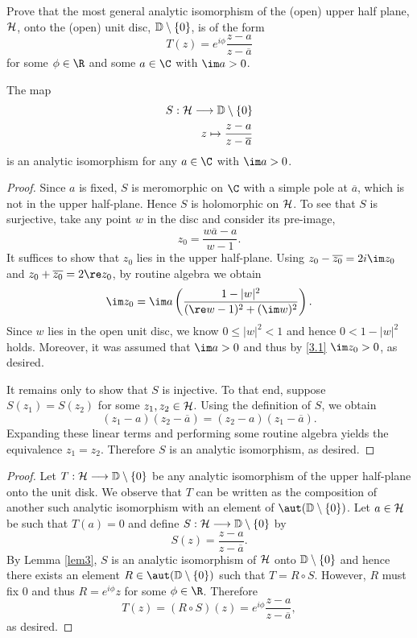 \documentclass[10pt]{amsart}
\begin{document}
\begin{thm}
  \label{Ex3}
  Prove that the most general analytic isomorphism of the (open) upper half plane, $\mathcal{H}$, onto the (open) unit disc, $\mathbb{D} \setminus \{0\}$, is of the form
  $$T(z) = e^{i\phi}\frac{z-a}{z-\overline{a}}$$
  for some $\phi \in \R$ and some $a \in \C$ with $\im a > 0$.

  \begin{lem}
    \label{lem3}
    The map
    \begin{align*}
      S:\mathcal{H} \longrightarrow \mathbb{D} \setminus \{0\} \\
      z \mapsto \frac{z-a}{z-\overline{a}}
    \end{align*}
    is an analytic isomorphism for any $a \in \C$ with $\im a>0$.
    \begin{proof}
      Since $a$ is fixed, $S$ is meromorphic on $\C$ with a simple pole at $\overline{a}$, which is not in the upper half-plane.  Hence $S$ is holomorphic on $\mathcal{H}$.
      To see that $S$ is surjective, take any point $w$ in the disc and consider its pre-image, $$z_0 = \frac{w\overline{a} - a}{w - 1}.$$
      It suffices to show that $z_0$ lies in the upper half-plane.  
      Using $z_0 - \overline{z_0} = 2i\im z_0$ and $z_0 + \overline{z_0} = 2\re z_0$, by routine algebra we obtain
      \begin{equation}
        \label{3.1}
        \im z_0 = \im a\left(\frac{1 - |w|^2}{(\re w - 1)^2 + (\im w)^2} \right).
      \end{equation}
      Since $w$ lies in the open unit disc, we know $0 \leq |w|^2 < 1$ and hence  $0 < 1 - |w|^2$ holds.
      Moreover, it was assumed that $\im a > 0$ and thus by \eqref{3.1} $\im z_0 > 0$, as desired.
      
      It remains only to show that $S$ is injective.  To that end, suppose $S(z_1) = S(z_2)$ for some $z_1, z_2 \in \mathcal{H}$.
      Using the definition of $S$, we obtain
      $$(z_1 - a)(z_2 - \overline{a}) = (z_2 - a)(z_1 - \overline{a}).$$
      Expanding these linear terms and performing some routine algebra yields the equivalence $z_1 = z_2$.
      Therefore $S$ is an analytic isomorphism, as desired.
    \end{proof}
  \end{lem}
  \begin{proof}
    Let $T: \mathcal{H} \longrightarrow \mathbb{D} \setminus \{0\}$ be any analytic isomorphism of the upper half-plane onto the unit disk.
    We observe that $T$ can be written as the composition of another such analytic isomorphism with an element of $\aut(\D)$.
    Let $a\in \mathcal{H}$ be such that $T(a) = 0$ and define $S: \mathcal{H} \longrightarrow \mathbb{D} \setminus \{0\}$ by $$S(z) = \frac{z-a}{z-\overline{a}}.$$
    By Lemma \ref{lem3}, $S$ is an analytic isomorphism of $\mathcal{H}$ onto $\mathbb{D} \setminus \{0\}$ and hence there exists an element $R \in \aut(\D)$ such that $T = R \circ S$.
    However, $R$ must fix 0 and thus $R = e^{i\phi}z$ for some $\phi \in \R$.
    Therefore $$T(z) = (R \circ S)(z)= e^{i\phi}\frac{z-a}{z - \overline{a}},$$ as desired.
  \end{proof}
\end{thm}
\end{document}
